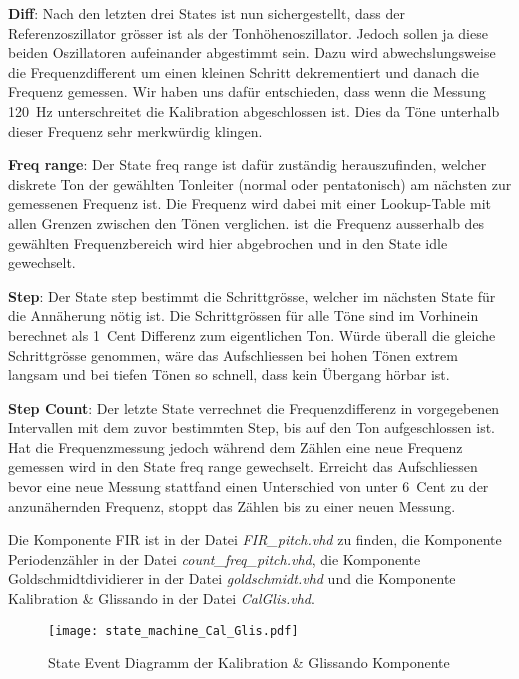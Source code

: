 \textbf{Diff}:
Nach den letzten drei States ist nun sichergestellt, dass der Referenzoszillator grösser ist als der Tonhöhenoszillator. Jedoch sollen ja diese beiden Oszillatoren aufeinander abgestimmt sein. Dazu wird abwechslungsweise die Frequenzdifferent um einen kleinen Schritt dekrementiert und danach die Frequenz gemessen. Wir haben uns dafür entschieden, dass wenn die Messung \SI{120}{Hz} unterschreitet die Kalibration abgeschlossen ist. Dies da Töne unterhalb dieser Frequenz sehr merkwürdig klingen.

\textbf{Freq range}:
Der State freq range ist dafür zuständig herauszufinden, welcher diskrete Ton der gewählten Tonleiter (normal oder pentatonisch) am nächsten zur gemessenen Frequenz ist. Die Frequenz wird dabei mit einer Lookup-Table mit allen Grenzen zwischen den Tönen verglichen. ist die Frequenz ausserhalb des gewählten Frequenzbereich wird hier abgebrochen und in den State idle gewechselt.

\textbf{Step}:
Der State step bestimmt die Schrittgrösse, welcher im nächsten State für die Annäherung nötig ist. Die Schrittgrössen für alle Töne sind im Vorhinein berechnet als \SI{1}{Cent} Differenz zum eigentlichen Ton. Würde überall die gleiche Schrittgrösse genommen, wäre das Aufschliessen bei hohen Tönen extrem langsam und bei tiefen Tönen so schnell, dass kein Übergang hörbar ist. 

\textbf{Step Count}:
Der letzte State verrechnet die Frequenzdifferenz in vorgegebenen Intervallen mit dem zuvor bestimmten Step, bis auf den Ton aufgeschlossen ist. Hat die Frequenzmessung jedoch während dem Zählen eine neue Frequenz gemessen wird in den State freq range gewechselt. Erreicht das Aufschliessen bevor eine neue Messung stattfand einen Unterschied von unter \SI{6}{Cent} zu der anzunähernden Frequenz, stoppt das Zählen bis zu einer neuen Messung.


Die Komponente FIR ist in der Datei \textit{FIR\_pitch.vhd} zu finden, die Komponente Periodenzähler in der Datei \textit{count\_freq\_pitch.vhd}, die Komponente Goldschmidtdividierer in der Datei \textit{goldschmidt.vhd} und die Komponente Kalibration \& Glissando in der Datei \textit{CalGlis.vhd}.

\begin{figure}[h!]
	\centering
	\texttt{[image: state\_machine\_Cal\_Glis.pdf]}
	\caption{State Event Diagramm der Kalibration \& Glissando Komponente} 
	\label{img:state_event_Cal_Glis}
\end{figure} 

